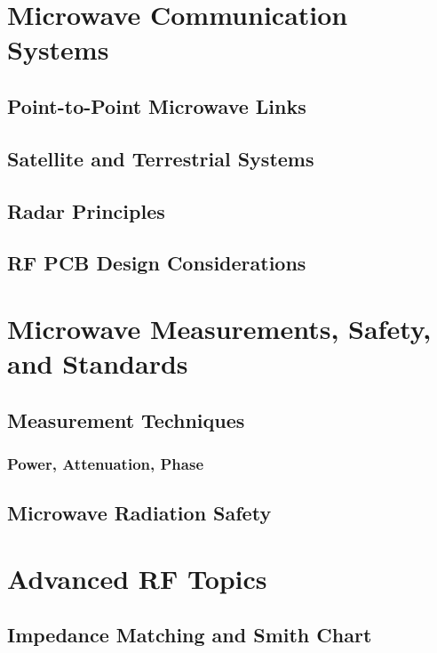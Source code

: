 \documentclass[11pt]{article}
\begin{document}
\section{Microwave Communication Systems} \label{sec:microwave_communications}
\subsection{Point-to-Point Microwave Links} \label{subsec:microwave_links}
\subsection{Satellite and Terrestrial Systems} \label{subsec:satellite_systems}
\subsection{Radar Principles} \label{subsec:radar}
\subsection{RF PCB Design Considerations} \label{subsec:rf_pcb}

\section{Microwave Measurements, Safety, and Standards}
\label{sec:microwave_measurements}
\subsection{Measurement Techniques} \label{subsec:measurement_techniques}
\subsubsection{Power, Attenuation, Phase}
\subsection{Microwave Radiation Safety} \label{subsec:microwave_safety}

\section{Advanced RF Topics} \label{sec:advanced_rf}
\subsection{Impedance Matching and Smith Chart}
\label{subsec:impedance_matching}
\end{document}
